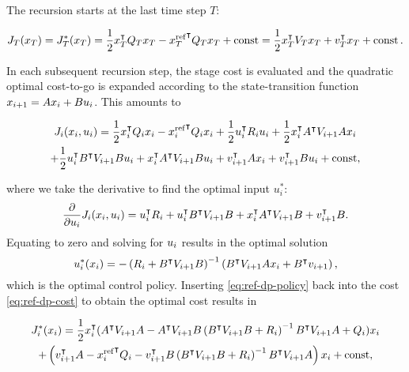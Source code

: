 The recursion starts at the last time step $T$:
\begin{fullwidth}\vspace{-\baselineskip}
\begin{equation}
  J_T(x_T) = J_T^*(x_T) = \frac{1}{2} x_T^{\intercal} Q_T x_T - {x^\text{ref}_T}^{\intercal} Q_T x_T +
\operatorname{const}
  = \frac{1}{2} x_T^{\intercal} V_T x_T + v_T^{\intercal} x_T + \operatorname{const}.
\end{equation}
\end{fullwidth}
In each subsequent recursion step, the stage cost is evaluated and the
quadratic optimal cost-to-go is expanded according to the state-transition
function $x_{i+1}=Ax_i+Bu_i$. This amounts to
\begin{fullwidth}\vspace{-\baselineskip}
\begin{multline}
  \label{eq:ref-dp-cost}
  J_\i(x_\i, u_\i) = \frac{1}{2} x_\i\T \SC_\i x_\i - {\xref_\i}\T \SC_\i x_i
  + \frac{1}{2} u_\i\T \CC_\i u_\i
  + \frac{1}{2} x_i\T A\T \VM_{\i+1} Ax_\i \\
  + \frac{1}{2} u_i\T B\T \VM_{\i+1} B u_i + x_i\T A\T \VM_{\i+1} B u_\i
  + \vv_{\i+1}\T Ax_\i + \vv_{\i+1}\T B u_\i + \const,
\end{multline}
\end{fullwidth}
where we take the derivative to find the optimal input $u_i^*$:
\begin{equation}
  \frac{\partial}{\partial u_i} J_i(x_i, u_i) = u_i^{\intercal} R_i + u_i^{\intercal} B^{\intercal} V_{i+1} B
  + x_i^{\intercal} A^{\intercal} V_{i+1} B + v_{i+1}^{\intercal} B.
\end{equation}
Equating to zero and solving for $u_i$ results in the optimal solution
\begin{equation}
  \label{eq:ref-dp-policy}
  u_\i^*(x_\i) = -\left(R_\i + B\T \VM_{\i+1} B\right)\inv
  \left(B\T \VM_{\i+1} A x_\i + B\T \vv_{\i+1}\right),
\end{equation}
which is the optimal control policy. Inserting
\eqref{eq:ref-dp-policy} back into the cost \eqref{eq:ref-dp-cost} to obtain
the optimal cost results in
\begin{fullwidth}\vspace{-\baselineskip}
\begin{multline}
  J_i^*(x_i) =
  \frac{1}{2} x_i^{\intercal} (A^{\intercal} V_{i+1} A
    - A^{\intercal} V_{i+1} B \left(B^{\intercal} V_{i+1} B + R_i\right)^{-1}
    B^{\intercal} V_{i+1} A + Q_i) x_i \\
  + \left(v_{i+1}^{\intercal} A - {x^\text{ref}_i}^{\intercal} Q_i - v_{i+1}^{\intercal} B
    \left(B^{\intercal} V_{i+1} B + R_i\right)^{-1} B^{\intercal} V_{i+1} A\right)x_i +
\operatorname{const},
\end{multline}
\end{fullwidth}
